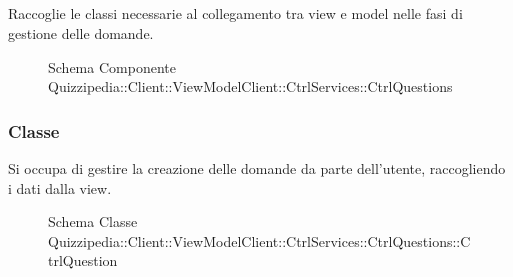 \subsection{}
Raccoglie le classi necessarie al collegamento tra view e model nelle fasi di gestione delle domande.
\begin{figure}[H]
\centering
\noindent{}
\caption[Schema Componente Quizzipedia::Client::ViewModelClient::CtrlServices::CtrlQuestions]{Schema Componente Quizzipedia::Client::ViewModelClient::CtrlServices::CtrlQuestions}
\end{figure}
\subsubsection{Classe }
Si occupa di gestire la creazione delle domande da parte dell'utente, raccogliendo i dati dalla view.
\begin{figure}[H]
\centering
\noindent{}
\caption[Schema Classe CtrlQuestion]{Schema Classe Quizzipedia::Client::ViewModelClient::CtrlServices::CtrlQuestions::CtrlQuestion}
\end{figure}
